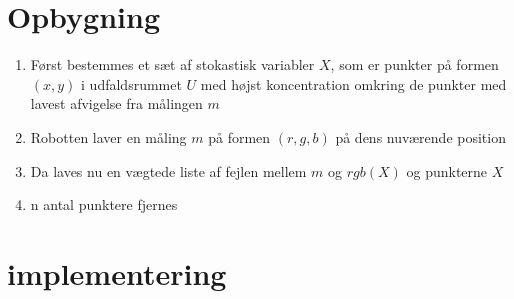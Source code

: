 \documentclass[../../SRP.tex]{subfiles}
\begin{document}
\section{Opbygning}

\begin{enumerate}
  \item Først bestemmes et sæt af stokastisk variabler $X$, som er punkter på formen $(x,y)$ i udfaldsrummet $U$ med højst koncentration omkring de punkter med lavest afvigelse fra målingen $m$

  \item Robotten laver en måling $m$ på formen $(r,g,b)$ på dens nuværende position

  \item Da laves nu en vægtede liste af fejlen mellem $m$ og $rgb(X)$ og punkterne $X$

  \item n antal punktere fjernes
\end{enumerate}

\section{implementering}
\end{document}
